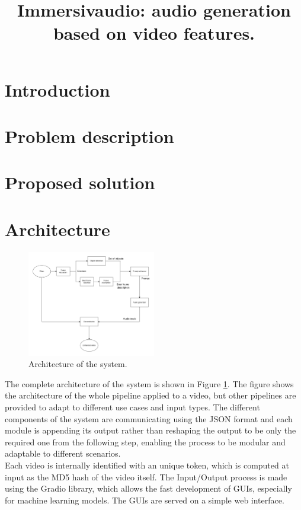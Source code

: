 \documentclass[conference]{IEEEtran}
\begin{document}
\title{Immersivaudio: audio generation based on video features.}

\author{
\and
{}
\and
{}
}

\maketitle

\section{Introduction}

\section{Problem description}

\section{Proposed solution}

\section{Architecture}

\begin{figure}[h]
    \centerline{\includegraphics[width=0.5\textwidth]{final_architecture.png}}
    \caption{Architecture of the system.}
    \label{architecture}
\end{figure}
The complete architecture of the system is shown in Figure \ref{architecture}.
The figure shows the architecture of the whole pipeline applied to a video,
but other pipelines are provided to adapt to different use cases and input types.
The different components of the system are communicating using the JSON format and each module is appending its output rather than reshaping the output to be only the required one from the following step, enabling the process to be modular and adaptable to different scenarios.\\
Each video is internally identified with an unique token, which is computed at input as the MD5 hash of the video itself. 
The Input/Output process is made using the Gradio \cite{Gradio} library, which allows the fast development of GUIs, especially for machine learning models. The GUIs are served on a simple web interface.
 
\end{document}
